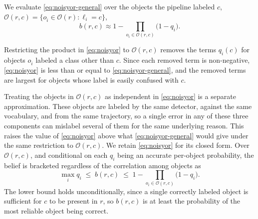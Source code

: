 We evaluate \cref{eq:noisyor-general} over the objects the pipeline labeled $c$, $\mathcal{O}(r, c) = \{o^{}_i \in \mathcal{O}(r) : \ell^{}_i = c\}$,
\begin{equation}
    b(r, c) \approx 1 - \prod_{o_i \in \mathcal{O}(r, c)} \bigl(1 - q^{}_i\bigr).
    \label{eq:noisyor}
\end{equation}

Restricting the product in \cref{eq:noisyor} to $\mathcal{O}(r,c)$ removes the terms $q^{}_i(c)$ for objects $o^{}_i$ labeled a class other than $c$. Since each removed term is non-negative, \cref{eq:noisyor} is less than or equal to \cref{eq:noisyor-general}, and the removed terms are largest for objects whose label is easily confused with $c$.

Treating the objects in $\mathcal{O}(r,c)$ as independent in \cref{eq:noisyor} is a separate approximation. These objects are labeled by the same detector, against the same vocabulary, and from the same trajectory, so a single error in any of these three components can mislabel several of them for the same underlying reason.
This raises the value of \cref{eq:noisyor} above what \cref{eq:noisyor-general} would give under the same restriction to $\mathcal{O}(r,c)$.
We retain \cref{eq:noisyor} for its closed form. Over $\mathcal{O}(r,c)$, and conditional on each $q^{}_i$ being an accurate per-object probability, the belief is bracketed regardless of the correlation among objects as
\begin{equation}
    \max_i q^{}_i \;\leq\; b(r,c) \;\leq\; 1 - \prod_{o_i \in \mathcal{O}(r,c)} \bigl(1 - q^{}_i\bigr).
    \label{eq:bracket}
\end{equation}
The lower bound holds unconditionally, since a single correctly labeled object is sufficient for $c$ to be present in $r$, so $b(r,c)$ is at least the probability of the most reliable object being correct.
